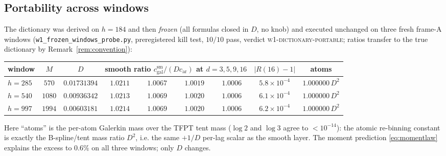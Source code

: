 \documentclass[11pt,a4paper]{article}
\theoremstyle{remark}
\begin{document}
\subsection{Portability across windows}
The dictionary was derived on $h=184$ and then \emph{frozen} (all
formulas closed in $D$, no knob) and executed unchanged on three fresh
frame-A windows (\texttt{w1\_frozen\_windows\_probe.py}, preregistered
kill test, $10/10$ pass, verdict \textsc{w1-dictionary-portable};
ratios transfer to the true dictionary by
Remark~\ref{rem:convention}):

\begin{center}
\small
\setlength{\tabcolsep}{4.5pt}
\begin{tabular}{lcccccccc}
\toprule
window & $M$ & $D$ & \multicolumn{4}{c}{smooth ratio
$c^{\mathrm{sm}}_{\mathrm{gal}}/(Dc_{\mathrm{ar}})$ at
$d=3,5,9,16$} & $|R(16)-1|$ & atoms\\
\midrule
$h=285$ & $570$ & $0.01731394$ & $1.0211$ & $1.0067$ & $1.0019$
& $1.0006$ & $5.8\times10^{-4}$ & $1.000000\,D^2$\\
$h=540$ & $1080$ & $0.00936342$ & $1.0213$ & $1.0069$ & $1.0020$
& $1.0006$ & $6.1\times10^{-4}$ & $1.000000\,D^2$\\
$h=997$ & $1994$ & $0.00603181$ & $1.0214$ & $1.0069$ & $1.0020$
& $1.0006$ & $6.2\times10^{-4}$ & $1.000000\,D^2$\\
\bottomrule
\end{tabular}
\end{center}

\noindent Here ``atoms'' is the per-atom Galerkin mass over the TFPT
tent mass ($\log2$ and $\log3$ agree to $<10^{-14}$): the atomic
re-binning constant is exactly the B-spline/tent mass ratio $D^2$, i.e.
the same $+1/D$ per-lag scalar as the smooth layer.  The moment
prediction \eqref{eq:momentlaw} explains the excess to $0.6\%$ on all
three windows; only $D$ changes.
\end{document}
